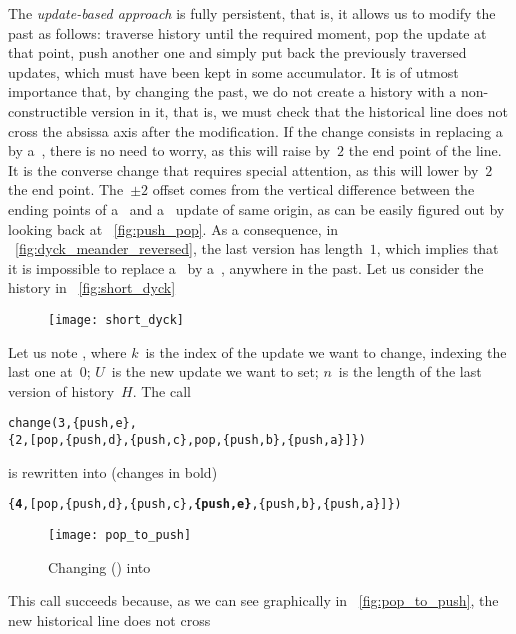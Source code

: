 The \emph{update\hyp{}based approach} is fully persistent, that is, it
allows us to modify the past as follows: traverse history until the
required moment, pop the update at that point, push another one and
simply put back the previously traversed updates, which must have been
kept in some accumulator. It is of utmost importance that, by changing
the past, we do not create a history with a non\hyp{}constructible
version in it, that is, we must check that the historical line does
not cross the absissa axis after the modification. If the change
consists in replacing a~ by a~, there is no
need to worry, as this will raise by~\(2\) the end point of the
line. It is the converse change that requires special attention, as
this will lower by~\(2\) the end point. The~\(\pm 2\) offset comes
from the vertical difference between the ending points of
a~ and a~ update of same origin, as can be
easily figured out by looking back at \fig~\vref{fig:push_pop}. As a
consequence, in \fig~\vref{fig:dyck_meander_reversed}, the last
version has length~\(1\), which implies that it is impossible to
replace a~ by a~, anywhere in the past.
Let us consider the history in \fig~\vref{fig:short_dyck}
\begin{figure}
\centering
\texttt{[image: short\_dyck]}
\caption{
\label{fig:short_dyck}}
\end{figure}
Let us note , where
\(k\)~is the index of the update we want to change, indexing the last
one at~\(0\); \(U\)~is the new update we want to set; \(n\)~is the
length of the last version of history~\(H\). The call
\begin{alltt}
  change(3,\{push,e\},
         \{2,[pop,\{push,d\},\{push,c\},pop,\{push,b\},\{push,a\}]\})
\end{alltt}
is rewritten into (changes in bold)
\begin{center}
\texttt{\{\textbf{4},[pop,\{push,d\},\{push,c\},\textbf{\{push,e\}},\{push,b\},\{push,a\}]\})}
\end{center}
\begin{figure}%
\centering
\texttt{[image: pop\_to\_push]}
\caption{Changing  () into 
\label{fig:pop_to_push}}
\end{figure}
This call succeeds because, as we can see graphically in
\fig~\vref{fig:pop_to_push}, the new historical line does not cross
